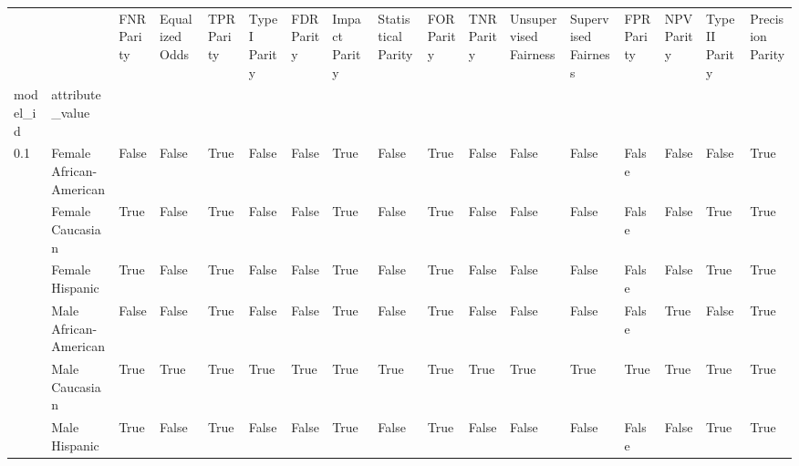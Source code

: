 \begin{tabular}{lllllllllllllllll}
\toprule
    &               &  FNR Parity &  Equalized Odds &  TPR Parity &  TypeI Parity &  FDR Parity &  Impact Parity &  Statistical Parity &  FOR Parity &  TNR Parity &  Unsupervised Fairness &  Supervised Fairness &  FPR Parity &  NPV Parity &  TypeII Parity &  Precision Parity \\
model\_id & attribute\_value &             &                 &             &               &             &                &                     &             &             &                        &                      &             &             &                &                   \\
\midrule
0.1 & Female African-American &       False &           False &        True &         False &       False &           True &               False &        True &       False &                  False &                False &       False &       False &          False &              True \\
    & Female Caucasian &        True &           False &        True &         False &       False &           True &               False &        True &       False &                  False &                False &       False &       False &           True &              True \\
    & Female Hispanic &        True &           False &        True &         False &       False &           True &               False &        True &       False &                  False &                False &       False &       False &           True &              True \\
    & Male African-American &       False &           False &        True &         False &       False &           True &               False &        True &       False &                  False &                False &       False &        True &          False &              True \\
    & Male Caucasian &        True &            True &        True &          True &        True &           True &                True &        True &        True &                   True &                 True &        True &        True &           True &              True \\
    & Male Hispanic &        True &           False &        True &         False &       False &           True &               False &        True &       False &                  False &                False &       False &       False &           True &              True \\

\end{tabular}
